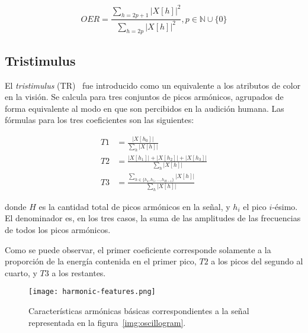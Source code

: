 \begin{equation}
    OER = \frac{\sum_{h=2p+1}{|X[h]|^2}}{\sum_{h=2p}{|X[h]|^2}}, p\in\mathbb{N}\cup \{ 0 \}
\end{equation}

\subsection{Tristimulus}\label{subsec:tristimulus}

El \textit{tristimulus} (TR)~\cite{Peters04,Gunasekaran11} fue introducido como un equivalente a los atributos de color en la visión.
Se calcula para tres conjuntos de picos armónicos, agrupados de forma equivalente al modo en que son percibidos en la audición humana.
Las fórmulas para los tres coeficientes son las siguientes:

\begin{equation}
    \begin{aligned}
        T1 & = \frac{|X[h_0]|}{\sum_{h}{|X[h]|}} \\
        T2 & = \frac{|X[h_1]|+|X[h_2]|+|X[h_3]|}{\sum_{h}{|X[h]|}} \\
        T3 & = \frac{\sum_{h\in \{h_4, h_5, \ldots, h_{H-1}\}}{|X[h]|}}{\sum_{h}{|X[h]|}}
    \end{aligned}
\end{equation}

\noindent
donde $H$ es la cantidad total de picos armónicos en la señal, y $h_i$ el pico $i$-ésimo.
El denominador es, en los tres casos, la suma de las amplitudes de las frecuencias de todos los picos armónicos.

Como se puede observar, el primer coeficiente corresponde solamente a la proporción de la energía contenida en el primer pico, $T2$ a los picos del segundo al cuarto, y $T3$ a los restantes.

\begin{figure}[!h]
    \centering
    \texttt{[image: harmonic-features.png]}
    \caption{Características armónicas básicas correspondientes a la señal representada en la figura~\ref{img:oscillogram}.}
    \label{img:harmonic-features}
\end{figure}
